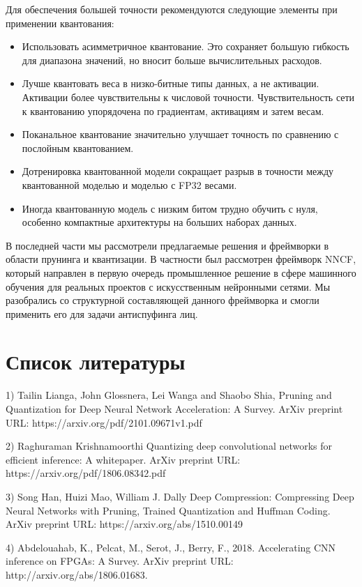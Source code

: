 \documentclass[oneside,final,12pt]{extreport}
\begin{document}
Для обеспечения большей точности рекомендуются следующие элементы при применении квантования:
\begin{itemize}
\item Использовать асимметричное квантование. Это сохраняет большую гибкость для диапазона значений, но вносит больше вычислительных расходов.
\item Лучше квантовать веса в низко-битные типы данных, а не активации. Активации более чувствительны к числовой точности. Чувствительность сети к квантованию упорядочена по градиентам, активациям и затем весам.
\item Поканальное квантование значительно улучшает точность по сравнению с послойным квантованием.
\item Дотренировка квантованной модели сокращает разрыв в точности между квантованной моделью и моделью с FP32 весами.
\item Иногда квантованную модель с низким битом трудно обучить с нуля, особенно компактные архитектуры на больших наборах данных.
\end{itemize}

В последней части мы рассмотрели предлагаемые решения и фреймворки в области прунинга и квантизации. В частности был рассмотрен фреймворк NNCF, который направлен в первую очередь промышленное решение в сфере машинного обучения для реальных проектов с искусственным нейронными сетями. Мы разобрались со структурной составляющей данного фреймворка и смогли применить его для задачи антиспуфинга лиц.

\chapter{Список литературы}
1) Tailin Lianga, John Glossnera, Lei Wanga and Shaobo Shia, Pruning and Quantization for Deep Neural Network Acceleration: A Survey. ArXiv preprint URL: https://arxiv.org/pdf/2101.09671v1.pdf

2) Raghuraman Krishnamoorthi Quantizing deep convolutional networks for efficient inference: A whitepaper. ArXiv preprint URL: https://arxiv.org/pdf/1806.08342.pdf

3) Song Han, Huizi Mao, William J. Dally Deep Compression: Compressing Deep Neural Networks with Pruning, Trained Quantization and Huffman Coding. ArXiv preprint URL: https://arxiv.org/abs/1510.00149

4) Abdelouahab, K., Pelcat, M., Serot, J., Berry, F., 2018. Accelerating
CNN inference on FPGAs: A Survey. ArXiv preprint URL: http://arxiv.org/abs/1806.01683.
\end{document}
